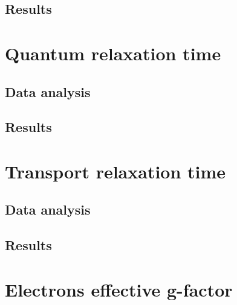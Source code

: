 \documentclass[12pt,a4paper]{article}
\begin{document}
\subsection{Results}



\section{Quantum relaxation time}
\subsection{Data analysis}


\subsection{Results}



\section{Transport relaxation time}
\subsection{Data analysis}

\subsection{Results}



\section{Electrons effective g-factor}
\end{document}
